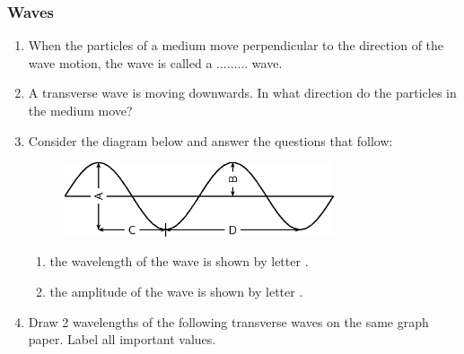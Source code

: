             \subsubsection{ Waves }
            \nopagebreak
            \label{m38806*id320717}\begin{enumerate}[noitemsep, label=\textbf{\arabic*}. ] 
            \label{m38806*uid30}\item When the particles of a medium move perpendicular to the direction of the wave motion, the wave is called a $.........$ wave.\newline
\label{m38806*uid31}\item A transverse wave is moving downwards. In what direction do the particles in the medium move?\newline
\label{m38806*uid32}\item Consider the diagram below and answer the questions that follow:
    \setcounter{subfigure}{0}
	\begin{figure}[H] %
    \begin{center}
    \label{m38806*id320776!!!underscore!!!media}\label{m38806*id320776!!!underscore!!!printimage}\includegraphics[width=300px]{col11305.imgs/m38806_PG10C5_012.png} %
      \vspace{2pt}
    \vspace{.1in}
    \end{center}
 \end{figure}       \label{m38806*id320783}\begin{enumerate}[noitemsep, label=\textbf{\alph*}. ] 
            \label{m38806*uid33}\item the wavelength of the wave is shown by letter \uline{\hspace{10ex}}.
\label{m38806*uid34}\item the amplitude of the wave is shown by letter \uline{\hspace{10ex}}.
\end{enumerate}
                \label{m38806*uid35}\item Draw 2 wavelengths of the following transverse waves on the same graph paper. Label all important values.
\label{m38806*id320849}\begin{enumerate}[noitemsep, label=\textbf{\alph*}. ] 

\end{enumerate}
\end{enumerate}
